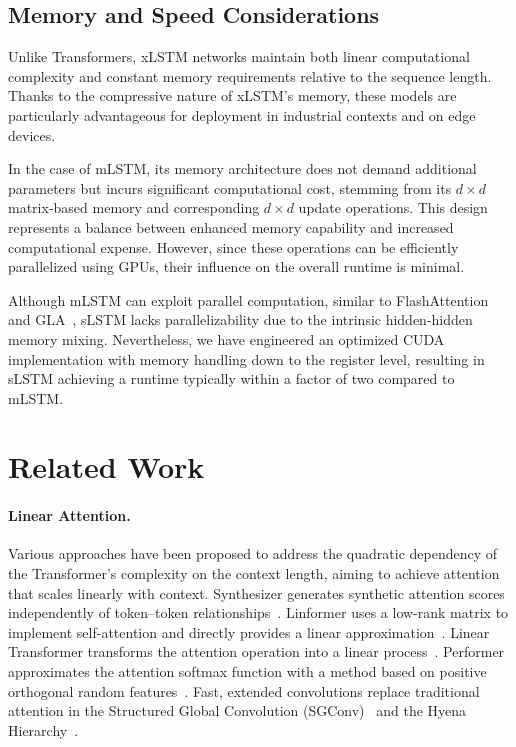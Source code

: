 \subsection{Memory and Speed Considerations}

Unlike Transformers, xLSTM networks maintain both linear computational complexity and constant memory requirements relative to the sequence length. Thanks to the compressive nature of xLSTM’s memory, these models are particularly advantageous for deployment in industrial contexts and on edge devices.

In the case of mLSTM, its memory architecture does not demand additional parameters but incurs significant computational cost, stemming from its $d \times d$ matrix-based memory and corresponding $d \times d$ update operations. This design represents a balance between enhanced memory capability and increased computational expense. However, since these operations can be efficiently parallelized using GPUs, their influence on the overall runtime is minimal.

Although mLSTM can exploit parallel computation, similar to FlashAttention~\citep{Dao:22,Dao:23} and GLA~\citep{Yang:23arxiv}, sLSTM lacks parallelizability due to the intrinsic hidden-hidden memory mixing. Nevertheless, we have engineered an optimized CUDA implementation with memory handling down to the register level, resulting in sLSTM achieving a runtime typically within a factor of two compared to mLSTM.

\section{Related Work}
\label{sec:related}

\paragraph{Linear Attention.} Various approaches have been proposed to address the quadratic dependency of the Transformer’s complexity on the context length, aiming to achieve attention that scales linearly with context. Synthesizer generates synthetic attention scores independently of token--token relationships~\citep{Tay:20arxiv}. Linformer uses a low-rank matrix to implement self-attention and directly provides a linear approximation~\citep{Wang:20arxiv}. Linear Transformer transforms the attention operation into a linear process~\citep{Katharopoulos:20}. Performer approximates the attention softmax function with a method based on positive orthogonal random features~\citep{Choromanski:21}. Fast, extended convolutions replace traditional attention in the Structured Global Convolution (SGConv)~\citep{Li:22} and the Hyena Hierarchy~\citep{Poli:23}.

